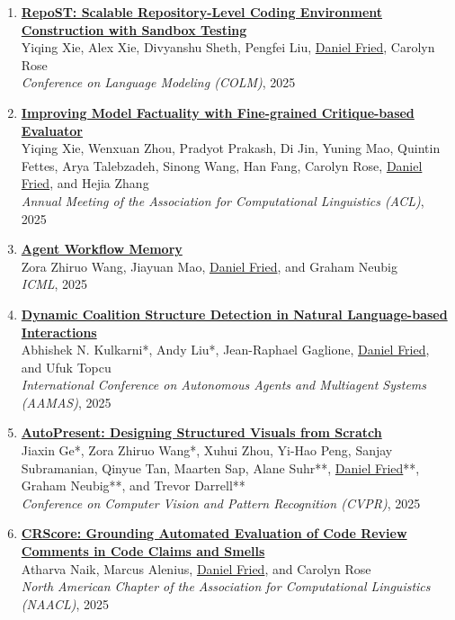 \begin{enumerate}[leftmargin=-1mm,partopsep=0pt]
\item \href{https://arxiv.org/abs/2503.07358}{\textbf{RepoST: Scalable Repository-Level Coding Environment Construction with Sandbox Testing}} \\
  Yiqing Xie, Alex Xie, Divyanshu Sheth, Pengfei Liu, \underline{Daniel Fried}, Carolyn Rose\\
  \emph{Conference on Language Modeling (COLM)}, 2025

\item \href{https://arxiv.org/abs/2410.18359}{\textbf{Improving Model Factuality with Fine-grained Critique-based Evaluator}} \\
  Yiqing Xie, Wenxuan Zhou, Pradyot Prakash, Di Jin, Yuning Mao, Quintin Fettes, Arya Talebzadeh, Sinong Wang, Han Fang, Carolyn Rose, \underline{Daniel Fried}, and Hejia Zhang\\
  \emph{Annual Meeting of the Association for Computational Linguistics (ACL)}, 2025

\item \href{https://arxiv.org/abs/2409.07429}{\textbf{Agent Workflow Memory}} \\
  Zora Zhiruo Wang, Jiayuan Mao, \underline{Daniel Fried}, and Graham Neubig\\
  \emph{ICML}, 2025

\item \href{https://arxiv.org/abs/2502.16339}{\textbf{Dynamic Coalition Structure Detection in Natural Language-based Interactions}} \\
  Abhishek N. Kulkarni*, Andy Liu*, Jean-Raphael Gaglione, \underline{Daniel Fried}, and Ufuk Topcu\\
  \emph{International Conference on Autonomous Agents and Multiagent Systems (AAMAS)}, 2025

\item \href{https://arxiv.org/abs/2501.00912}{\textbf{AutoPresent: Designing Structured Visuals from Scratch}} \\
  Jiaxin Ge*, Zora Zhiruo Wang*, Xuhui Zhou, Yi-Hao Peng, Sanjay Subramanian, Qinyue Tan, Maarten Sap, Alane Suhr**, \underline{Daniel Fried}**, Graham Neubig**, and Trevor Darrell**\\
  \emph{Conference on Computer Vision and Pattern Recognition (CVPR)}, 2025

\item \href{https://arxiv.org/abs/2409.19801}{\textbf{CRScore: Grounding Automated Evaluation of Code Review Comments in Code Claims and Smells}} \\
  Atharva Naik, Marcus Alenius, \underline{Daniel Fried}, and Carolyn Rose\\
  \emph{North American Chapter of the Association for Computational Linguistics (NAACL)}, 2025


\end{enumerate}
